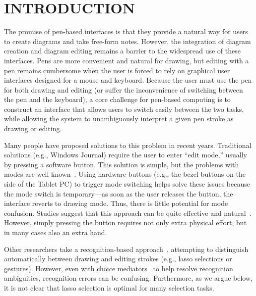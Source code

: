 \documentclass{article}
\begin{document}




\section{INTRODUCTION}

The promise of pen-based interfaces is that they provide a natural way
for users to create diagrams and take free-form notes.  However, the
integration of diagram creation and diagram editing remains a barrier
to the widespread use of these interfaces.  Pens are more convenient
and natural for drawing, but editing with a pen remains cumbersome
when the user is forced to rely on graphical user interfaces designed
for a mouse and keyboard.  Because the user must use the pen for both
drawing and editing (or suffer the inconvenience of switching between
the pen and the keyboard), a core challenge for pen-based computing is
to construct an interface that allows users to switch easily between
the two tasks, while allowing the system to unambiguously interpret a
given pen stroke as drawing or editing.

Many people have proposed solutions to this problem in recent years.  Traditional solutions (e.g., Windows Journal) require the user to
enter ``edit mode,'' usually by pressing a software button.  This
solution is simple, but the problems with modes are well
known~\cite{Tesler1981Smalltalk}.  Using hardware buttons (e.g., the
bezel buttons on the side of the Tablet PC) to trigger mode switching
helps solve these issues because the mode switch is temporary---as
soon as the user releases the button, the interface reverts to drawing
mode.  Thus, there is little potential for mode confusion.  Studies
suggest that this approach can be quite effective and
natural~\cite{Li2005Experimental,Hinckley2006Springboard}.  However,
simply pressing the button requires not only extra physical effort,
but in many cases also an extra hand.

Other researchers take a recognition-based
approach~\cite{Saund2003Stylus,Zeleznik2006Fluid}, attempting to distinguish
automatically between drawing and editing strokes (e.g., lasso
selections or gestures).  However, even with choice
mediators~\cite{Mankoff2000Providing} to help resolve recognition
ambiguities, recognition errors can be confusing.  Furthermore, as we
argue below, it is not clear that lasso selection is optimal for many
selection tasks.
\end{document}
